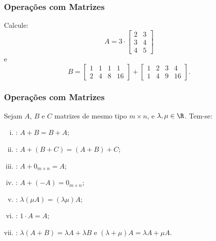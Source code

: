 \begin{frame}
    \frametitle{Operações com Matrizes}
    
    \begin{exemplo}
        Calcule: 
        \begin{displaymath} A = 3 \cdot 
            \begin{bmatrix}
                2 & 3 \\
                3 & 4 \\
                4 & 5
            \end{bmatrix}
        \end{displaymath}
        e
        \begin{displaymath}   B = 
            \begin{bmatrix}
                1 & 1 & 1 & 1 \\
                2 & 4 & 8 & 16
            \end{bmatrix} + 
            \begin{bmatrix}
                1 & 2 & 3 & 4 \\
                1 & 4 & 9 & 16
            \end{bmatrix}.
        \end{displaymath}
    \end{exemplo}
\end{frame}


\begin{frame}
	\frametitle{Operações com Matrizes} 
	
	\begin{proposicao}
		\label{propopmatriz1}
		Sejam $A$, $B$ e $C$ matrizes de mesmo tipo $m \times n$, e $\lambda , \mu \in \R$. Tem-se:
		\begin{enumerate}[i.]
			\item {}: $A+B = B+A$;
			\item {}: $A + (B+C) = (A+B)+C$;
			\item {}: $A + 0_{m \times n} = A$;
			\item {}: $A + (-A) = 0_{m \times n}$;
			\item {}: $\lambda (\mu A) = (\lambda \mu) A$;
            \item {}: $1\cdot A = A$;
			\item {}: $\lambda(A+B) = \lambda A + \lambda B$ e $(\lambda +\mu)A = \lambda A + \mu A$.
		\end{enumerate}
	\end{proposicao} 

\end{frame}


